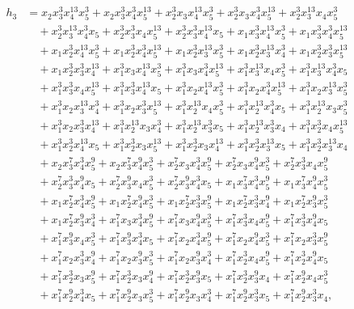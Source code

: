 \documentclass[reqno]{amsart}
\theoremstyle{plain}
\theoremstyle{definition}
\theoremstyle{plain}
\theoremstyle{definition}
\numberwithin{equation}{section}
\begin{document}
\begin{align*}
h_3 &= x_2x_3^{3}x_4^{13}x_5^{3} + x_2x_3^{3}x_4^{3}x_5^{13} + x_2^{3}x_3x_4^{13}x_5^{3} + x_2^{3}x_3x_4^{3}x_5^{13} + x_2^{3}x_3^{13}x_4x_5^{3}\\ &\quad + x_2^{3}x_3^{13}x_4^{3}x_5 + x_2^{3}x_3^{3}x_4x_5^{13} + x_2^{3}x_3^{3}x_4^{13}x_5 + x_1x_3^{3}x_4^{13}x_5^{3} + x_1x_3^{3}x_4^{3}x_5^{13}\\ &\quad + x_1x_2^{3}x_4^{13}x_5^{3} + x_1x_2^{3}x_4^{3}x_5^{13} + x_1x_2^{3}x_3^{13}x_5^{3} + x_1x_2^{3}x_3^{13}x_4^{3} + x_1x_2^{3}x_3^{3}x_5^{13}\\ &\quad + x_1x_2^{3}x_3^{3}x_4^{13} + x_1^{3}x_3x_4^{13}x_5^{3} + x_1^{3}x_3x_4^{3}x_5^{13} + x_1^{3}x_3^{13}x_4x_5^{3} + x_1^{3}x_3^{13}x_4^{3}x_5\\ &\quad + x_1^{3}x_3^{3}x_4x_5^{13} + x_1^{3}x_3^{3}x_4^{13}x_5 + x_1^{3}x_2x_4^{13}x_5^{3} + x_1^{3}x_2x_4^{3}x_5^{13} + x_1^{3}x_2x_3^{13}x_5^{3}\\ &\quad + x_1^{3}x_2x_3^{13}x_4^{3} + x_1^{3}x_2x_3^{3}x_5^{13} + x_1^{3}x_2^{13}x_4x_5^{3} + x_1^{3}x_2^{13}x_4^{3}x_5 + x_1^{3}x_2^{13}x_3x_5^{3}\\ &\quad + x_1^{3}x_2x_3^{3}x_4^{13} + x_1^{3}x_2^{13}x_3x_4^{3} + x_1^{3}x_2^{13}x_3^{3}x_5 + x_1^{3}x_2^{13}x_3^{3}x_4 + x_1^{3}x_2^{3}x_4x_5^{13}\\ &\quad + x_1^{3}x_2^{3}x_4^{13}x_5 + x_1^{3}x_2^{3}x_3x_5^{13} + x_1^{3}x_2^{3}x_3x_4^{13} + x_1^{3}x_2^{3}x_3^{13}x_5 + x_1^{3}x_2^{3}x_3^{13}x_4\\ &\quad + x_2x_3^{7}x_4^{3}x_5^{9} + x_2x_3^{7}x_4^{9}x_5^{3} + x_2^{7}x_3x_4^{3}x_5^{9} + x_2^{7}x_3x_4^{9}x_5^{3} + x_2^{7}x_3^{3}x_4x_5^{9}\\ &\quad + x_2^{7}x_3^{3}x_4^{9}x_5 + x_2^{7}x_3^{9}x_4x_5^{3} + x_2^{7}x_3^{9}x_4^{3}x_5 + x_1x_3^{7}x_4^{3}x_5^{9} + x_1x_3^{7}x_4^{9}x_5^{3}\\ &\quad + x_1x_2^{7}x_4^{3}x_5^{9} + x_1x_2^{7}x_4^{9}x_5^{3} + x_1x_2^{7}x_3^{3}x_5^{9} + x_1x_2^{7}x_3^{3}x_4^{9} + x_1x_2^{7}x_3^{9}x_5^{3}\\ &\quad + x_1x_2^{7}x_3^{9}x_4^{3} + x_1^{7}x_3x_4^{3}x_5^{9} + x_1^{7}x_3x_4^{9}x_5^{3} + x_1^{7}x_3^{3}x_4x_5^{9} + x_1^{7}x_3^{3}x_4^{9}x_5\\ &\quad + x_1^{7}x_3^{9}x_4x_5^{3} + x_1^{7}x_3^{9}x_4^{3}x_5 + x_1^{7}x_2x_4^{3}x_5^{9} + x_1^{7}x_2x_4^{9}x_5^{3} + x_1^{7}x_2x_3^{3}x_5^{9}\\ &\quad + x_1^{7}x_2x_3^{3}x_4^{9} + x_1^{7}x_2x_3^{9}x_5^{3} + x_1^{7}x_2x_3^{9}x_4^{3} + x_1^{7}x_2^{3}x_4x_5^{9} + x_1^{7}x_2^{3}x_4^{9}x_5\\ &\quad + x_1^{7}x_2^{3}x_3x_5^{9} + x_1^{7}x_2^{3}x_3x_4^{9} + x_1^{7}x_2^{3}x_3^{9}x_5 + x_1^{7}x_2^{3}x_3^{9}x_4 + x_1^{7}x_2^{9}x_4x_5^{3}\\ &\quad + x_1^{7}x_2^{9}x_4^{3}x_5 + x_1^{7}x_2^{9}x_3x_5^{3} + x_1^{7}x_2^{9}x_3x_4^{3} + x_1^{7}x_2^{9}x_3^{3}x_5 + x_1^{7}x_2^{9}x_3^{3}x_4,\\

\end{align*}
\end{document}
